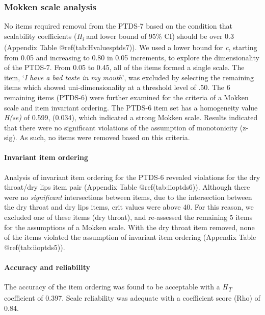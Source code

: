 \documentclass[letterpaper,9pt,twocolumn,twoside,]{pinp}
\begin{document}
\hypertarget{mokken-scale-analysis}{%
\subsubsection{Mokken scale analysis}\label{mokken-scale-analysis}}

No items required removal from the PTDS-7 based on the condition that
scalability coefficients (\emph{H\textsubscript{i}} and lower bound of
95\% CI) should be over 0.3 (Appendix Table @ref(tab:Hvaluesptds7)). We
used a lower bound for \emph{c}, starting from 0.05 and increasing to
0.80 in 0.05 increments, to explore the dimensionality of the PTDS-7.
From 0.05 to 0.45, all of the items formed a single scale. The item,
`\emph{I have a bad taste in my mouth}', was excluded by selecting the
remaining items which showed uni-dimensionality at a threshold level of
.50. The 6 remaining items (PTDS-6) were further examined for the
criteria of a Mokken scale and item invariant ordering. The PTDS-6 item
set has a homogeneity value \emph{H(se)} of 0.599, (0.034), which
indicated a strong Mokken scale. Results indicated that there were no
significant violations of the assumption of monotonicity (z-sig). As
such, no items were removed based on this criteria.

\hypertarget{invariant-item-ordering}{%
\paragraph{Invariant item ordering}\label{invariant-item-ordering}}

Analysis of invariant item ordering for the PTDS-6 revealed violations
for the dry throat/dry lips item pair (Appendix Table
@ref(tab:iioptds6)). Although there were no \emph{significant}
intersections between items, due to the intersection between the dry
throat and dry lips items, crit values were above 40. For this reason,
we excluded one of these items (dry throat), and re-assessed the
remaining 5 items for the assumptions of a Mokken scale. With the dry
throat item removed, none of the items violated the assumption of
invariant item ordering (Appendix Table @ref(tab:iioptds5)).

\hypertarget{accuracy-and-reliability}{%
\paragraph{Accuracy and reliability}\label{accuracy-and-reliability}}

The accuracy of the item ordering was found to be acceptable with a
\emph{H\textsubscript{T}} coefficient of 0.397. Scale reliability was
adequate with a coefficient score (Rho) of 0.84.
\end{document}
